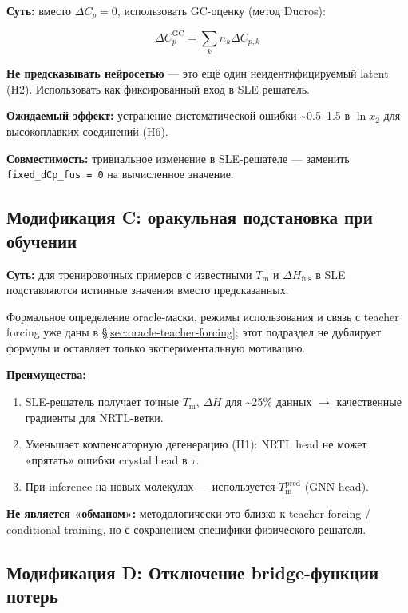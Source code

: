 \documentclass[11pt]{article}
\begin{document}
\textbf{Суть:} вместо $\Delta C_p = 0$, использовать GC-оценку (метод Ducros):

\begin{equation*}
\Delta C_p^{\mathrm{GC}} = \sum_k n_k \Delta C_{p,k}
\end{equation*}

\textbf{Не предсказывать нейросетью} --- это ещё один неидентифицируемый latent (H2). Использовать как фиксированный вход в SLE решатель.

\textbf{Ожидаемый эффект:} устранение систематической ошибки \textasciitilde0.5--1.5 в $\ln x_2$ для высокоплавких соединений (H6).

\textbf{Совместимость:} тривиальное изменение в SLE-решателе --- заменить \texttt{fixed\_dCp\_fus = 0} на вычисленное значение.

\subsection{Модификация C: оракульная подстановка при обучении}
\label{subsec:mod-c}

\textbf{Суть:} для тренировочных примеров с известными $T_{\mathrm{m}}$ и $\Delta H_{\mathrm{fus}}$ в SLE подставляются истинные значения вместо предсказанных.

Формальное определение oracle-маски, режимы использования и связь с teacher forcing уже даны в §\ref{sec:oracle-teacher-forcing}; этот подраздел не дублирует формулы и оставляет только экспериментальную мотивацию.

\textbf{Преимущества:}
\begin{enumerate}
  \item SLE-решатель получает точные $T_{\mathrm{m}}$, $\Delta H$ для \textasciitilde25\% данных $\to$ качественные градиенты для NRTL-ветки.
  \item Уменьшает компенсаторную дегенерацию (H1): NRTL head не может «прятать» ошибки crystal head в $\tau$.
  \item При inference на новых молекулах --- используется $T_{\mathrm{m}}^{\mathrm{pred}}$ (GNN head).
\end{enumerate}

\textbf{Не является «обманом»:} методологически это близко к teacher forcing / conditional training, но с сохранением специфики физического решателя.

\subsection{Модификация D: Отключение bridge-функции потерь}
\label{subsec:mod-d}
\end{document}
